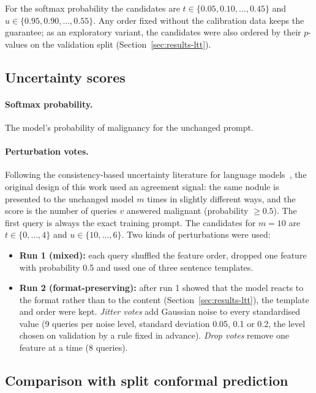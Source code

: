 For the softmax probability the candidates are $t \in \{0.05, 0.10, \dots, 0.45\}$ and
$u \in \{0.95, 0.90, \dots, 0.55\}$. Any order fixed without the calibration data keeps the
guarantee; as an exploratory variant, the candidates were also ordered by their $p$-values on the
validation split (Section~\ref{sec:results-ltt}).

\subsection{Uncertainty scores}
\label{sec:methods-scores}

\paragraph{Softmax probability.} The model's probability of malignancy for the unchanged prompt.

\paragraph{Perturbation votes.} Following the consistency-based uncertainty literature for
language models~\citep{ashby2026,noorani2025}, the original design of this work used an
agreement signal: the same nodule is presented to the unchanged model $m$ times in slightly
different ways, and the score is the number of queries $v$ answered malignant (probability
$\ge 0.5$). The first query is always the exact training prompt. The candidates for $m = 10$ are
$t \in \{0, \dots, 4\}$ and $u \in \{10, \dots, 6\}$. Two kinds of perturbations were used:

\begin{itemize}
  \item \textbf{Run 1 (mixed):} each query shuffled the feature order, dropped one feature with
        probability 0.5 and used one of three sentence templates.
  \item \textbf{Run 2 (format-preserving):} after run 1 showed that the model reacts to the format
        rather than to the content (Section~\ref{sec:results-ltt}), the template and order were
        kept. \emph{Jitter votes} add Gaussian noise to every standardised value (9 queries per
        noise level, standard deviation 0.05, 0.1 or 0.2, the level chosen on validation by a
        rule fixed in advance). \emph{Drop votes} remove one feature at a time (8 queries).
\end{itemize}

\subsection{Comparison with split conformal prediction}
\label{sec:methods-splitcp}

